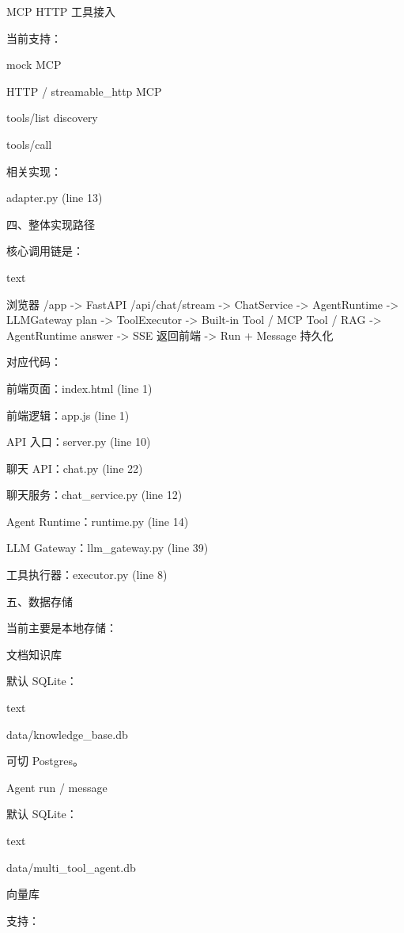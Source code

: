 MCP HTTP 工具接入

当前支持：


mock MCP

HTTP / streamable_http MCP

tools/list discovery

tools/call


相关实现：


adapter.py (line 13)




四、整体实现路径

核心调用链是：

text



浏览器 /app
  -> FastAPI /api/chat/stream
  -> ChatService
  -> AgentRuntime
  -> LLMGateway plan
  -> ToolExecutor
  -> Built-in Tool / MCP Tool / RAG
  -> AgentRuntime answer
  -> SSE 返回前端
  -> Run + Message 持久化



对应代码：


前端页面：index.html (line 1)

前端逻辑：app.js (line 1)

API 入口：server.py (line 10)

聊天 API：chat.py (line 22)

聊天服务：chat_service.py (line 12)

Agent Runtime：runtime.py (line 14)

LLM Gateway：llm_gateway.py (line 39)

工具执行器：executor.py (line 8)


五、数据存储

当前主要是本地存储：


文档知识库

默认 SQLite：

text



data/knowledge_base.db



可切 Postgres。



Agent run / message

默认 SQLite：

text



data/multi_tool_agent.db





向量库

支持：


